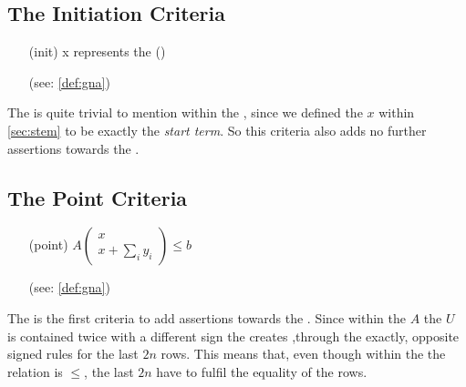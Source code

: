 \subsection{The Initiation Criteria}
\begin{itemize}
	\setlength{\itemindent}{1in}
	\item[(init)] x represents the \startterm (\stem)
	\item[] (see: \autoref{def:gna})
\end{itemize}

The \initc is quite trivial to mention within the \solver, since we defined the \stem $x$ within \autoref{sec:stem} to be exactly the  \textit{start term}.\newline
So this criteria also adds no further assertions towards the \solver.

\subsection{The Point Criteria}
\label{sec:point-criteria}
\begin{itemize}
	\setlength{\itemindent}{1in}
	\item[(point)] $A\begin{pmatrix} x \\ x + \sum_i y_i \end{pmatrix} \le b$
	\item[] (see: \autoref{def:gna})
\end{itemize}

The \pointc is the first criteria to add assertions towards the \solver.\newline
Since within the \iterationmatrix $A$ the \updatematrix $U$ is contained twice with a different sign the \iterationmatrix creates ,through the \pointc exactly, opposite signed rules for the last $2n$ rows.
This means that, even though within the \pointc the relation is $\le$, the last $2n$ have to fulfil the equality of the rows.\newline

